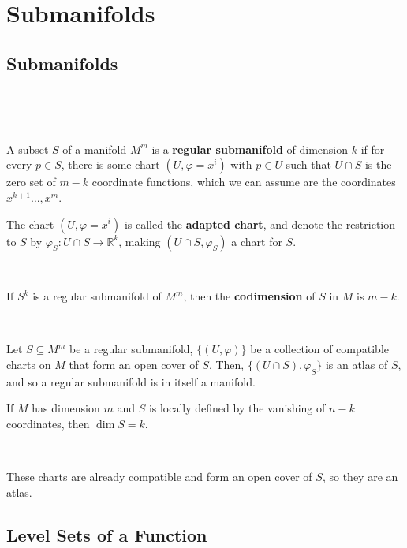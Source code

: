 \documentclass{article}
\begin{document}
\section{Submanifolds}

\subsection{Submanifolds}
\

\begin{definition}
  \

  A subset $S$ of a manifold $M^m$ is a \textbf{regular submanifold} of dimension $k$ if for every $p \in S$, there is some chart $(U, \varphi=x^i)$ with $p \in U$ such that $U \cap S$ is the zero set of $m-k$ coordinate functions, which we can assume are the coordinates $x^{k+1} \dots, x^m$.

  The chart $(U, \varphi = x^i)$ is called the \textbf{adapted chart}, and denote the restriction to $S$ by $\varphi_S: U \cap S \to \mathbb{R}^k$, making $(U \cap S, \varphi_S)$ a chart for $S$.
\end{definition}

\begin{definition}[Codimension]
  \

  If $S^k$ is a regular submanifold of $M^m$, then the \textbf{codimension} of $S$ in $M$ is $m - k$.
\end{definition}

\begin{proposition}
  \

  Let $S \subseteq M^m$ be a regular submanifold, $\{(U, \varphi)\}$ be a collection of compatible charts on $M$ that form an open cover of $S$. Then, $\{(U \cap S), \varphi_S\}$ is an atlas of $S$, and so a regular submanifold is in itself a manifold.

  If $M$ has dimension $m$ and $S$ is locally defined by the vanishing of $n-k$ coordinates, then $\dim S = k$.
\end{proposition}

\begin{customproof}
  \

  These charts are already compatible and form an open cover of $S$, so they are an atlas.
\end{customproof}

\subsection{Level Sets of a Function}
\
\end{document}
